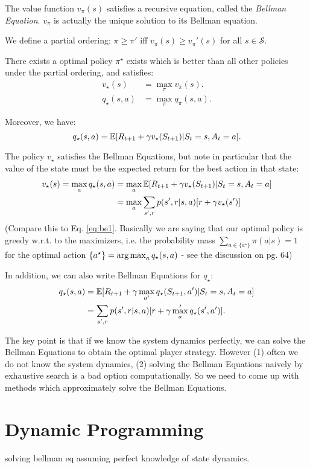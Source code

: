\documentclass{article}
\begin{document}
The value function $v_\pi(s)$ satisfies a recursive equation, called the \emph{Bellman Equation}. $v_\pi$ is actually the unique solution to its Bellman equation.

\begin{definition}
We define a partial ordering: $\pi \ge \pi'$ iff $v_\pi(s) \ge v_\pi'(s)$ for all $s\in \mathcal{S}$.
\end{definition}

\begin{claim}
There exists a optimal policy $\pi^\star$ exists which is better than all other policies under the partial ordering, and satisfies:
\begin{align}
    v_\star(s) &= \max_\pi v_\pi(s). \\
    q_\star(s,a) &= \max_\pi q_\pi(s,a).
\end{align}

Moreover, we have:
\begin{equation}
    q_\star(s,a) = \operatorname*{\mathbb{E}}[R_{t+1} + \gamma v_\star(S_{t+1})|S_t =s, A_t = a].
\end{equation}
\end{claim}

The policy $v_\star$ satisfies the Bellman Equations, but note in particular that the value of the state must be the expected return for the best action in that state:
\begin{align}
    v_\star(s) = \max_a q_\star(s,a) &= \max_a \operatorname*{\mathbb{E}}[R_{t+1} + \gamma v_\star(S_{t+1})|S_t=s, A_t=a] \\
    &= \max_a \sum_{s',r} p(s',r|s,a) [r+\gamma v_\star(s')] 
\end{align}
(Compare this to Eq. \ref{eq:be1}. Basically we are saying that our optimal policy is greedy w.r.t. to the maximizers, i.e. the probability mass $\sum_{a \in \{a^\star\}} \pi(a|s) = 1$ for the optimal action $\{a^\star\}= \operatorname*{arg\,max}_a q_\star(s,a)$ - see the discussion on pg. 64)

In addition, we can also write Bellman Equations for $q_\star$:
\begin{align}
    q_\star(s,a) &= \operatorname*{\mathbb{E}}[R_{t+1} + \gamma \max_{a'} q_\star(S_{t+1},a')|S_t=s, A_t=a]\\
    &= \sum_{s',r} p(s',r|s,a) [r+\gamma \max_a' q_\star(s',a')].
\end{align}

The key point is that if we know the system dynamics perfectly, we can solve the Bellman Equations to obtain the optimal player strategy. However (1) often we do not know the system dynamics, (2) solving the Bellman Equations naively by exhaustive search is a bad option computationally. So we need to come up with methods which approximately solve the Bellman Equations.

\section{Dynamic Programming}
solving bellman eq assuming perfect knowledge of state dynamics.
\end{document}
